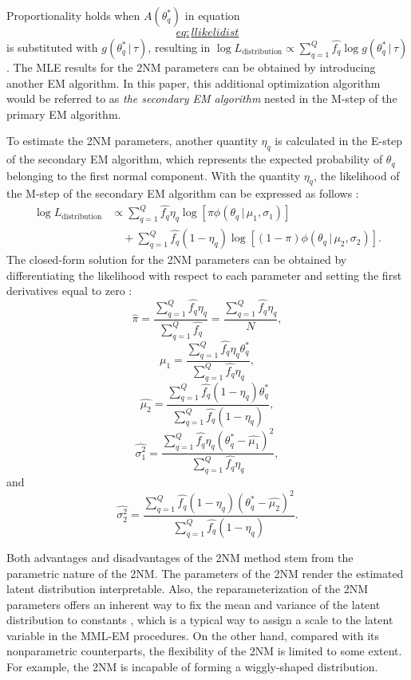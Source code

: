 Proportionality holds when \(A{\left( \theta^{*}_{q} \right)}\) in
equation \protect\hyperlink{eq:llikelidist}{\[eq:llikelidist\]} is substituted with
\(g{(\theta^{*}_{q} \, | \, \tau)}\), resulting in
\(\log{L_{\text{distribution}}}\propto \sum_{q = 1}^{Q}{ \hat{f_{q}} \log{g{(\theta^{*}_{q} \, | \, \tau)}} }\).
The MLE results for the 2NM parameters can be obtained by introducing
another EM algorithm. In this paper, this additional optimization
algorithm would be referred to as \emph{the secondary EM algorithm} nested in
the M-step of the primary EM algorithm.

To estimate the 2NM parameters, another quantity \(\eta_q\) is calculated
in the E-step of the secondary EM algorithm, which represents the
expected probability of \(\theta_q\) belonging to the first normal
component. With the quantity \(\eta_q\), the likelihood of the M-step of
the secondary EM algorithm can be expressed as follows \citep{Li:2021}:
\[\begin{split}
\log{L_{\text{distribution}}} &\propto
\sum_{q = 1}^{Q}{ \hat{f_q} \eta_q \log{\left[ \pi \phi{(\theta_q \, | \, \mu_1, \sigma_1)} \right]} } 
\\ &\quad + \sum_{q = 1}^{Q}{ \hat{f_q} (1 - \eta_q) \log{\left[ (1 - \pi) \phi{(\theta_q \, | \, \mu_2, \sigma_2)} \right]} }.
\end{split}
\label{eq:2nmlikeli}\] The closed-form solution for the 2NM parameters
can be obtained by differentiating the likelihood with respect to each
parameter and setting the first derivatives equal to zero \citep{Li:2021}:
\[\hat{\pi} = \frac{\sum_{q = 1}^{Q}{ \hat{f_q} \eta_{q}}}{\sum_{q = 1}^{Q}{ \hat{f_q}}} =
\frac{\sum_{q = 1}^{Q}{ \hat{f_q} \eta_{q}} }{N},
\label{eq:pi}\]
\[\hat{\mu_{1}} = \frac{\sum_{q = 1}^{Q}{ \hat{f_q} \eta_{q} \theta_{q}^{*}}}
{\sum_{q = 1}^{Q}{ \hat{f_q} \eta_{q}}},
\label{eq:mu1}\]
\[\hat{\mu_{2}} = \frac{\sum_{q = 1}^{Q}{ \hat{f_q} (1- \eta_{q}) \theta_{q}^{*}}}
{\sum_{q = 1}^{Q}{ \hat{f_q} (1- \eta_{q})}},
\label{eq:mu2}\]
\[\hat{\sigma_{1}^{2}} = \frac{\sum_{q = 1}^{Q}{ \hat{f_q} \eta_{q} \left( \theta_{q}^{*} - \hat{\mu_{1}} \right)^{2} }}
{\sum_{q = 1}^{Q}{ \hat{f_q} \eta_{q}}},
\label{eq:sigma1}\] and
\[\hat{\sigma_{2}^{2}} = \frac{\sum_{q = 1}^{Q}{ \hat{f_q} (1- \eta_{q}) \left( \theta_{q}^{*} - \hat{\mu_{2}} \right)^{2} }}
{\sum_{q = 1}^{Q}{ \hat{f_q} (1- \eta_{q})}}.
\label{eq:sigma2}\]

Both advantages and disadvantages of the 2NM method stem from the
parametric nature of the 2NM. The parameters of the 2NM render the
estimated latent distribution interpretable. Also, the
reparameterization of the 2NM parameters offers an inherent way to fix
the mean and variance of the latent distribution to constants \citep[see][]{Li:2021}, which is a typical way to assign a scale to the latent
variable in the MML-EM procedures. On the other hand, compared with its
nonparametric counterparts, the flexibility of the 2NM is limited to
some extent. For example, the 2NM is incapable of forming a
wiggly-shaped distribution.

